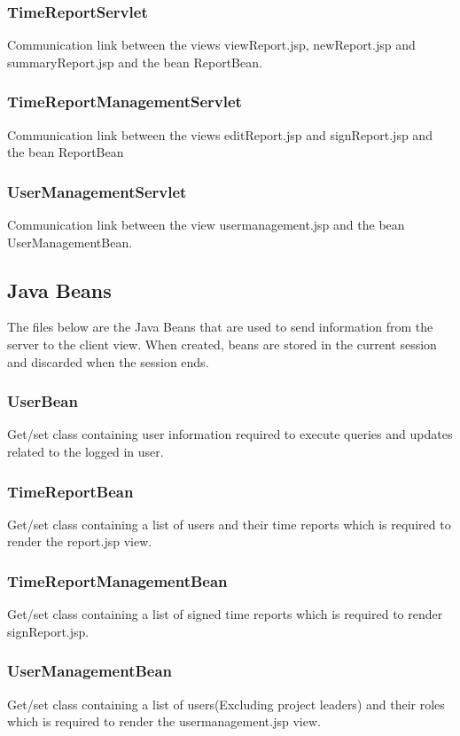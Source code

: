 \documentclass{article}
\begin{document}
\subsubsection{TimeReportServlet}
Communication link between the views viewReport.jsp, newReport.jsp and summaryReport.jsp and the bean ReportBean.

\subsubsection{TimeReportManagementServlet}
Communication link between the views editReport.jsp and signReport.jsp and the bean ReportBean

\subsubsection{UserManagementServlet}
Communication link between the view usermanagement.jsp and the bean UserManagementBean.

\subsection{Java Beans}
The files below are the Java Beans that are used to send information from the server to the client view. When created, beans are stored in the current session and discarded when the session ends.

\subsubsection{UserBean}
Get/set class containing user information required to execute queries and updates related to the logged in user.

\subsubsection{TimeReportBean}
Get/set class containing a list of users and their time reports which is required to render the report.jsp view.

\subsubsection{TimeReportManagementBean}
Get/set class containing a list of signed time reports which is required to render signReport.jsp.

\subsubsection{UserManagementBean}
Get/set class containing a list of users(Excluding project leaders) and their roles which is required to render the usermanagement.jsp view.
\end{document}
